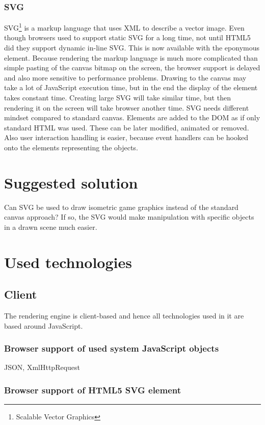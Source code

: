 \documentclass[11pt,oneside, final]{fithesis2}
\begin{document}
\subsection{SVG}
SVG\footnote{Scalable Vector Graphics} is a markup language that uses XML to describe a vector image. Even though browsers used to support static SVG for a long time, not until HTML5 did they support dynamic in-line SVG\cite{}. This is now available with the eponymous element. Because rendering the markup language is much more complicated than simple pasting of the canvas bitmap on the screen, the browser support is delayed and also more sensitive to performance problems. Drawing to the canvas may take a lot of JavaScript execution time, but in the end the display of the element takes constant time. Creating large SVG will take similar time, but then rendering it on the screen will take browser another time. 
SVG needs different mindset compared to standard canvas. Elements are added to the DOM as if only standard HTML was used. These can be later modified, animated or removed. Also user interaction handling is easier, because event handlers can be hooked onto the elements representing the objects.

\chapter{Suggested solution}
\label{solution}
Can SVG be used to draw isometric game graphics instead of the standard canvas approach? If so, the SVG would make manipulation with specific objects in a drawn scene much easier.

\chapter{Used technologies}
\label{tech}
\section{Client}
The rendering engine is client-based and hence all technologies used in it are based around JavaScript.

\subsection{Browser support of used system JavaScript objects}
JSON, XmlHttpRequest

\subsection{Browser support of HTML5 SVG element}
\end{document}
